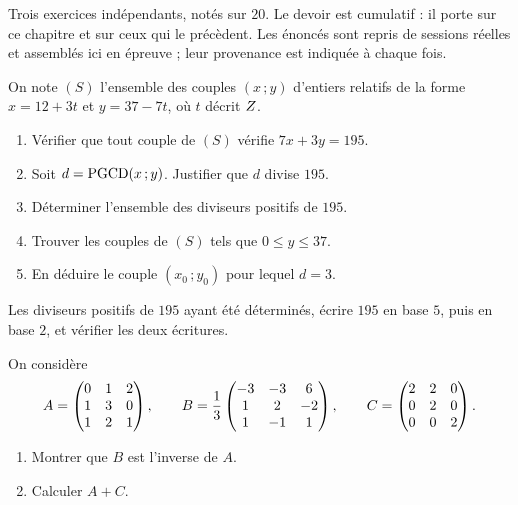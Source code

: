 \begin{devoir}[2 heures]
Trois exercices indépendants, notés sur $20$. Le devoir est cumulatif : il porte sur ce chapitre et sur ceux qui le précèdent. Les énoncés sont repris de sessions réelles et assemblés ici en épreuve ; leur provenance est indiquée à chaque fois.

On note $(S)$ l'ensemble des couples $(x\,;y)$ d'entiers relatifs de la forme
$x = 12+3t$ et $y = 37-7t$, où $t$ décrit $Z$.
\begin{enumerate}[label=\textbf{\arabic*)}, leftmargin=*, itemsep=0.15em]
  \item Vérifier que tout couple de $(S)$ vérifie $7x+3y = 195$.
  \item Soit $d = \operatorname{PGCD}(x\,;y)$. Justifier que $d$ divise $195$.
  \item Déterminer l'ensemble des diviseurs positifs de $195$.
  \item Trouver les couples de $(S)$ tels que $0 \leq y \leq 37$.
  \item En déduire le couple $(x_{0}\,;y_{0})$ pour lequel $d = 3$.
\end{enumerate}

Les diviseurs positifs de $195$ ayant été déterminés, écrire $195$ en base
$5$, puis en base $2$, et vérifier les deux écritures.

On considère
\[
  A = \begin{pmatrix} 0 & 1 & 2 \\ 1 & 3 & 0 \\ 1 & 2 & 1 \end{pmatrix}, \qquad
  B = \frac13\begin{pmatrix} -3 & -3 & 6 \\ 1 & 2 & -2 \\ 1 & -1 & 1 \end{pmatrix}, \qquad
  C = \begin{pmatrix} 2 & 2 & 0 \\ 0 & 2 & 0 \\ 0 & 0 & 2 \end{pmatrix}.
\]
\begin{enumerate}[label=\textbf{\arabic*)}, leftmargin=*, itemsep=0.15em]
  \item Montrer que $B$ est l'inverse de $A$.
  \item Calculer $A+C$.
\end{enumerate}

\end{devoir}

